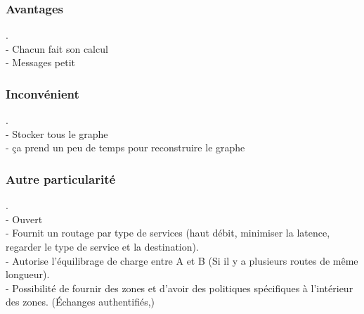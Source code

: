 \documentclass{article}
\begin{document}
\subsubsection{Avantages}
. \\
- Chacun fait son calcul \\
- Messages petit
\subsubsection{Inconvénient}
. \\
- Stocker tous le graphe \\
- ça prend un peu de temps pour reconstruire le graphe
\subsubsection{Autre particularité}
. \\
- Ouvert \\
- Fournit un routage par type de services (haut débit, minimiser la latence, regarder le type de service et la destination). \\
- Autorise l'équilibrage de charge entre A et B (Si il y a plusieurs routes de même longueur). \\
- Possibilité de fournir des zones et d'avoir des politiques spécifiques à l'intérieur des zones. (Échanges authentifiés,)
\end{document}
